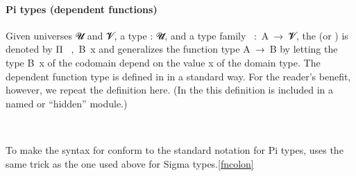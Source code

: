 \paragraph*{Pi types (dependent functions)} %
Given universes \ab 𝓤 and \ab 𝓥, a type  \as : \ab 𝓤\af ̇, and a type family ~\as :~\ab A~\as →~\ab 𝓥\af ̇, the  (or ) is denoted by \ar Π~ ,~\ab B~\ab x and generalizes the function type \ab A~\as →~\ab B by letting the type \ab B~\ab x of the codomain depend on the value \ab x of the domain type. The dependent function type is defined in \typtop in a standard way.  For the reader's benefit, however, we repeat the definition here.  (In the \ualib this definition is included in a named or ``hidden'' module.)
\ccpad
\begin{code}%
\>[1]\AgdaSpace{}%
\AgdaSymbol{:}\AgdaSpace{}%
\AgdaSymbol{\{}\AgdaSpace{}%
\AgdaSymbol{:}\AgdaSpace{}%
\AgdaSpace{}%
\AgdaSpace{}%
\AgdaSymbol{\}}\AgdaSpace{}%
\AgdaSymbol{(}\AgdaSpace{}%
\AgdaSymbol{:}\AgdaSpace{}%
\AgdaSpace{}%
\AgdaSpace{}%
\AgdaSpace{}%
\AgdaSpace{}%
\AgdaSymbol{)}\AgdaSpace{}%
\AgdaSpace{}%
\AgdaSpace{}%
\AgdaSpace{}%
\AgdaSpace{}%
\<%
\\
%
\>[1]\AgdaSpace{}%
\AgdaSymbol{\{}\AgdaSymbol{\}}\AgdaSpace{}%
\AgdaSpace{}%
\AgdaSymbol{=}\AgdaSpace{}%
\AgdaSymbol{(}\AgdaSpace{}%
\AgdaSymbol{:}\AgdaSpace{}%
\AgdaSymbol{)}\AgdaSpace{}%
\AgdaSpace{}%
\AgdaSpace{}%
\<%
\end{code}
\ccpad
To make the syntax for  conform to the standard notation for Pi types, \escardo uses the same trick as the one used above for Sigma types.\cref{fncolon}
\ccpad
